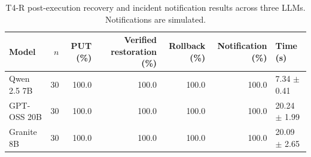 \begin{table}[t]
\centering
\small
\caption{T4-R post-execution recovery and incident notification results across three LLMs. Notifications are simulated.}
\label{tab:t4_recovery_results}
\begin{tabular}{lrrrrrl}
\hline
Model & $n$ & PUT (\%) & Verified restoration (\%) & Rollback (\%) & Notification (\%) & Time (s) \\
\hline
Qwen 2.5 7B & 30 & 100.0 & 100.0 & 100.0 & 100.0 & 7.34 $\pm$ 0.41 \\
GPT-OSS 20B & 30 & 100.0 & 100.0 & 100.0 & 100.0 & 20.24 $\pm$ 1.99 \\
Granite 8B & 30 & 100.0 & 100.0 & 100.0 & 100.0 & 20.09 $\pm$ 2.65 \\
\hline
\end{tabular}
\end{table}
